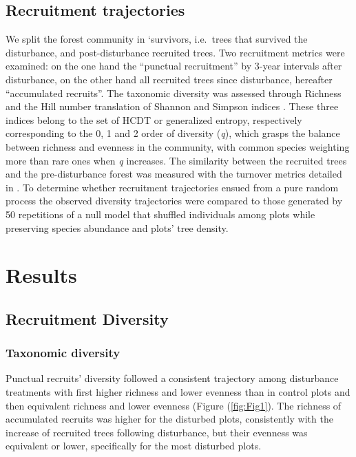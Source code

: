 \documentclass[fleqn,10pt]{ArtEcoFoG} %
\begin{document}
\subsection{Recruitment trajectories}\label{recruitment-trajectories}

We split the forest community in `survivors, i.e.~trees that survived
the disturbance, and post-disturbance recruited trees. Two recruitment
metrics were examined: on the one hand the ``punctual recruitment'' by
3-year intervals after disturbance, on the other hand all recruited
trees since disturbance, hereafter ``accumulated recruits''. The
taxonomic diversity was assessed through Richness and the Hill number
translation of Shannon and Simpson indices
\citep{Hill1973, chao2015estimating, Marcon2015b}. These three indices
belong to the set of HCDT or generalized entropy, respectively
corresponding to the 0, 1 and 2 order of diversity (\emph{q}), which
grasps the balance between richness and evenness in the community, with
common species weighting more than rare ones when \emph{q} increases.
The similarity between the recruited trees and the pre-disturbance
forest was measured with the turnover metrics detailed in
\citet{Podani2013a}. To determine whether recruitment trajectories
ensued from a pure random process the observed diversity trajectories
were compared to those generated by 50 repetitions of a null model that
shuffled individuals among plots while preserving species abundance and
plots' tree density.

\section{Results}\label{results}

\subsection{Recruitment Diversity}\label{recruitment-diversity}

\subsubsection{Taxonomic diversity}\label{taxonomic-diversity}

Punctual recruits' diversity followed a consistent trajectory among
disturbance treatments with first higher richness and lower evenness
than in control plots and then equivalent richness and lower evenness
(Figure (\ref{fig:Fig1}). The richness of accumulated recruits was
higher for the disturbed plots, consistently with the increase of
recruited trees following disturbance, but their evenness was equivalent
or lower, specifically for the most disturbed plots.
\end{document}
